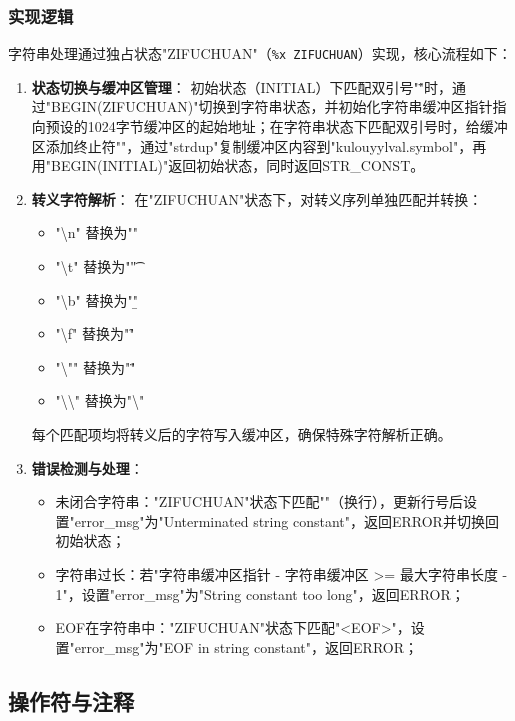 \documentclass[twocolumn]{article}
\begin{document}
\subsubsection{实现逻辑}
字符串处理通过独占状态"ZIFUCHUAN"（\texttt{\%x ZIFUCHUAN}）实现，核心流程如下：

\begin{enumerate}
    \item \textbf{状态切换与缓冲区管理}：
      初始状态（INITIAL）下匹配双引号"\""时，通过"BEGIN(ZIFUCHUAN)"切换到字符串状态，并初始化字符串缓冲区指针指向预设的1024字节缓冲区的起始地址；在字符串状态下匹配双引号时，给缓冲区添加终止符"\0"，通过"strdup"复制缓冲区内容到"kulouyylval.symbol"，再用"BEGIN(INITIAL)"返回初始状态，同时返回STR\_CONST。

    \item \textbf{转义字符解析}：
      在"ZIFUCHUAN"状态下，对转义序列单独匹配并转换：
      \begin{itemize}
          \item "\textbackslash n" 替换为"\n"
          \item "\textbackslash t" 替换为"\t"
          \item "\textbackslash b" 替换为"\b"
          \item "\textbackslash f" 替换为"\f"
          \item "\textbackslash "" 替换为"\""
          \item "\textbackslash\textbackslash" 替换为"\textbackslash"
      \end{itemize}
      每个匹配项均将转义后的字符写入缓冲区，确保特殊字符解析正确。

    \item \textbf{错误检测与处理}：
      \begin{itemize}
          \item 未闭合字符串："ZIFUCHUAN"状态下匹配"\n"（换行），更新行号后设置"error\_msg"为"Unterminated string constant"，返回ERROR并切换回初始状态；
          \item 字符串过长：若"字符串缓冲区指针 - 字符串缓冲区 >= 最大字符串长度 - 1"，设置"error\_msg"为"String constant too long"，返回ERROR；
          \item EOF在字符串中："ZIFUCHUAN"状态下匹配"<EOF>"，设置"error\_msg"为"EOF in string constant"，返回ERROR；
      \end{itemize}
\end{enumerate}


\subsection{操作符与注释}
\end{document}
